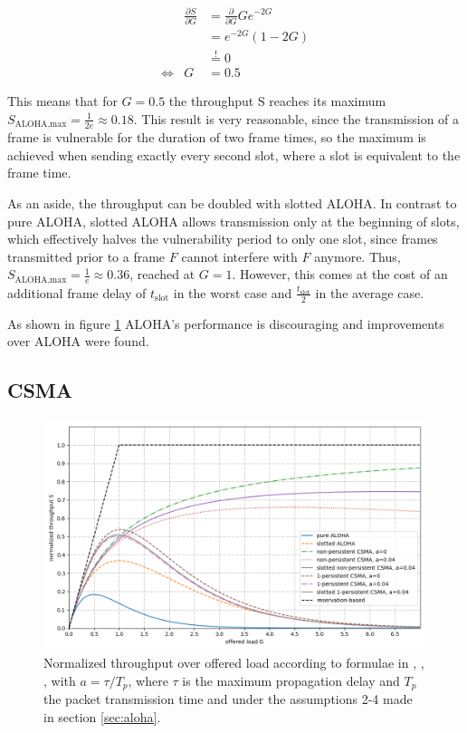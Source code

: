 \begin{eqnarray}
	& \frac{\partial S}{\partial G} & = \frac{\partial}{\partial G} Ge^{-2G} \\ 
	& & = e^{-2G}(1-2G) \\
	& & \stackrel{!}{=} 0 \\
	\Leftrightarrow & G & = 0.5
\end{eqnarray}
	
This means that for $G=0.5$ the throughput S reaches its maximum $S_\text{ALOHA,max} = \frac{1}{2e} \approx 0.18$. This result is very reasonable, since the transmission of a frame is vulnerable for the duration of two frame times, so the maximum is achieved when sending exactly every second slot, where a slot is equivalent to the frame time.

As an aside, the throughput can be doubled with slotted ALOHA. In contrast to pure ALOHA, slotted ALOHA allows transmission only at the beginning of slots, which effectively halves the vulnerability period to only one slot, since frames transmitted prior to a frame $F$ cannot interfere with $F$ anymore. Thus, $S_\text{ALOHA,max} = \frac{1}{e} \approx 0.36$, reached at $G=1$. However, this comes at the cost of an additional frame delay of $t_\text{slot}$ in the worst case and $\frac{t_\text{slot}}{2}$ in the average case.

As shown in figure \ref{fig:aloha-csma-performance} ALOHA's performance is discouraging and improvements over ALOHA were found. 

\subsection{CSMA}

\begin{figure}[tb]
	\label{fig:aloha-csma-performance}
	\begin{center}
		\includegraphics[width=\textwidth]{pictures/aloha_csma_performance}
	\end{center}
	\caption{Normalized throughput over offered load according to formulae in \cite{Garg07}, \cite{Bachir10},  \cite{Tanenbaum02}, with $a=\tau/T_p$, where $\tau$ is the maximum propagation delay and $T_p$ the packet transmission time and under the assumptions 2-4 made in section \ref{sec:aloha}. }
\end{figure}

